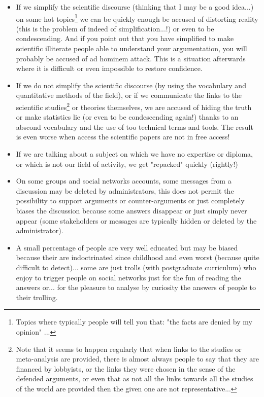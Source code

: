 	\begin{itemize}
		\item If we simplify the scientific discourse (thinking that I may be a good idea...) on some hot topics\footnote{Topics where typically people will tell you that: "the facts are denied by my opinion" ...} we can be quickly enough be accused of distorting reality (this is the problem of indeed of simplification...!) or even to be condescending. And if you point out that you have simplified to make scientific illiterate people able to understand your argumentation, you will probably be accused of ad hominem attack. This is a situation afterwards where it is difficult or even impossible to restore confidence.
	
		\item If we do not simplify the scientific discourse (by using the vocabulary and quantitative methods of the field), or if we communicate the links to the scientific studies\footnote{Note that it seems to happen regularly that when links to the studies or meta-analysis  are provided, there is almost always people to say that they are financed by lobbyists, or the links they were chosen in the sense of the defended arguments, or even that as not all the links towards all the studies of the world are provided then the given one are not representative...} or theories themselves, we are accused of hiding the truth or make statistics lie (or even to be condescending again!) thanks to an abscond vocabulary and the use of too technical terms and tools. The result is even worse when access the scientific papers are not in free access!
	
		\item If we are talking about a subject on which we have no expertise or diploma, or which is not our field of activity, we get "repacked" quickly (rightly!)
	
		\item On some groups and social networks accounts, some messages from a discussion may be deleted by administrators, this does not permit the possibility to support arguments or counter-arguments or just completely biases the discussion because some answers disappear or just simply never appear (some stakeholders or messages are typically hidden or deleted by the administrator).
		
		\item A small percentage of people are very well educated but may be biased because their are indoctrinated since childhood and even worst (because quite difficult to detect)... some are just trolls (with postgraduate curriculum) who enjoy to trigger people on social networks just for the fun of reading the answers or... for the pleasure to analyse by curiosity the answers of people to their trolling.
		

\end{itemize}
